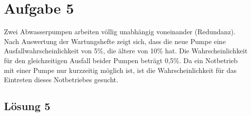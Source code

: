 \documentclass[main.tex]{subfiles}
\begin{document}
\section{Aufgabe 5}
Zwei Abwasserpumpen arbeiten völlig unabhängig voneinander (Redundanz). Nach Auswertung der Wartungshefte zeigt sich, dass die neue Pumpe eine Ausfallwahrscheinlichkeit von 5\%, die ältere von 10\% hat.
Die Wahrscheinlichkeit für den gleichzeitigen Ausfall beider Pumpen beträgt 0,5\%. Da ein Notbetrieb mit einer Pumpe nur kurzzeitig
möglich ist, ist die Wahrscheinlichkeit für das Eintreten dieses Notbetriebes gesucht.

\subsection{Lösung 5}
\end{document}
